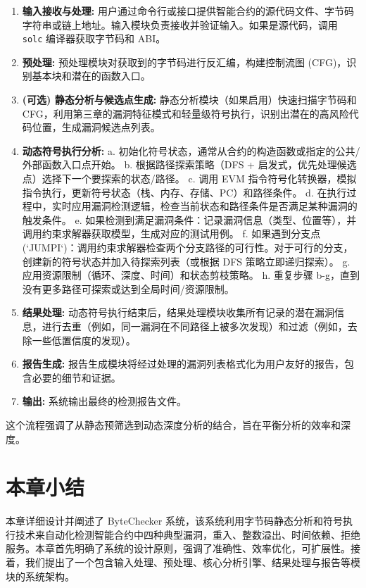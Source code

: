 \documentclass[print, master, vlined, timesmath]{DissertUESTC}
\begin{document}
\begin{enumerate}
    \item \textbf{输入接收与处理:} 用户通过命令行或接口提供智能合约的源代码文件、字节码字符串或链上地址。输入模块负责接收并验证输入。如果是源代码，调用 \texttt{solc} 编译器获取字节码和 ABI。
    \item \textbf{预处理:} 预处理模块对获取到的字节码进行反汇编，构建控制流图 (CFG)，识别基本块和潜在的函数入口。
    \item \textbf{(可选) 静态分析与候选点生成:} 静态分析模块（如果启用）快速扫描字节码和 CFG，利用第三章的漏洞特征模式和轻量级符号执行，识别出潜在的高风险代码位置，生成漏洞候选点列表。
    \item \textbf{动态符号执行分析:}
        a.  初始化符号状态，通常从合约的构造函数或指定的公共/外部函数入口点开始。
        b.  根据路径探索策略（DFS + 启发式，优先处理候选点）选择下一个要探索的状态/路径。
        c.  调用 EVM 指令符号化转换器，模拟指令执行，更新符号状态（栈、内存、存储、PC）和路径条件。
        d.  在执行过程中，实时应用漏洞检测逻辑，检查当前状态和路径条件是否满足某种漏洞的触发条件。
        e.  如果检测到满足漏洞条件：记录漏洞信息（类型、位置等），并调用约束求解器获取模型，生成对应的测试用例。
        f.  如果遇到分支点 (`JUMPI`)：调用约束求解器检查两个分支路径的可行性。对于可行的分支，创建新的符号状态并加入待探索列表（或根据 DFS 策略立即递归探索）。
        g.  应用资源限制（循环、深度、时间）和状态剪枝策略。
        h.  重复步骤 b-g，直到没有更多路径可探索或达到全局时间/资源限制。
    \item \textbf{结果处理:} 动态符号执行结束后，结果处理模块收集所有记录的潜在漏洞信息，进行去重（例如，同一漏洞在不同路径上被多次发现）和过滤（例如，去除一些低置信度的发现）。
    \item \textbf{报告生成:} 报告生成模块将经过处理的漏洞列表格式化为用户友好的报告，包含必要的细节和证据。
    \item \textbf{输出:} 系统输出最终的检测报告文件。
\end{enumerate}

这个流程强调了从静态预筛选到动态深度分析的结合，旨在平衡分析的效率和深度。

\section{本章小结}


本章详细设计并阐述了 ByteChecker 系统，该系统利用字节码静态分析和符号执行技术来自动化检测智能合约中四种典型漏洞，重入、整数溢出、时间依赖、拒绝服务。本章首先明确了系统的设计原则，强调了准确性、效率优化，可扩展性。接着，我们提出了一个包含输入处理、预处理、核心分析引擎、结果处理与报告等模块的系统架构。
\end{document}
